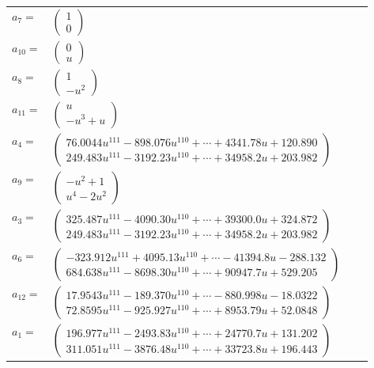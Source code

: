 \documentclass[1p]{elsarticle_modified}
\theoremstyle{definition}
\begin{document}
\begin{tabular}{m{7pt} m{180pt} m{7pt} m{180pt} }
\flushright $a_{7}=$&$\begin{pmatrix}1\\0\end{pmatrix}$ \\
\flushright $a_{10}=$&$\begin{pmatrix}0\\u\end{pmatrix}$ \\
\flushright $a_{8}=$&$\begin{pmatrix}1\\- u^2\end{pmatrix}$ \\
\flushright $a_{11}=$&$\begin{pmatrix}u\\- u^3+u\end{pmatrix}$ \\
\flushright $a_{4}=$&$\begin{pmatrix}76.0044 u^{111}-898.076 u^{110}+\cdots+4341.78 u+120.890\\249.483 u^{111}-3192.23 u^{110}+\cdots+34958.2 u+203.982\end{pmatrix}$ \\
\flushright $a_{9}=$&$\begin{pmatrix}- u^2+1\\u^4-2 u^2\end{pmatrix}$ \\
\flushright $a_{3}=$&$\begin{pmatrix}325.487 u^{111}-4090.30 u^{110}+\cdots+39300.0 u+324.872\\249.483 u^{111}-3192.23 u^{110}+\cdots+34958.2 u+203.982\end{pmatrix}$ \\
\flushright $a_{6}=$&$\begin{pmatrix}-323.912 u^{111}+4095.13 u^{110}+\cdots-41394.8 u-288.132\\684.638 u^{111}-8698.30 u^{110}+\cdots+90947.7 u+529.205\end{pmatrix}$ \\
\flushright $a_{12}=$&$\begin{pmatrix}17.9543 u^{111}-189.370 u^{110}+\cdots-880.998 u-18.0322\\72.8595 u^{111}-925.927 u^{110}+\cdots+8953.79 u+52.0848\end{pmatrix}$ \\
\flushright $a_{1}=$&$\begin{pmatrix}196.977 u^{111}-2493.83 u^{110}+\cdots+24770.7 u+131.202\\311.051 u^{111}-3876.48 u^{110}+\cdots+33723.8 u+196.443\end{pmatrix}$ \\

\end{tabular}
\end{document}

